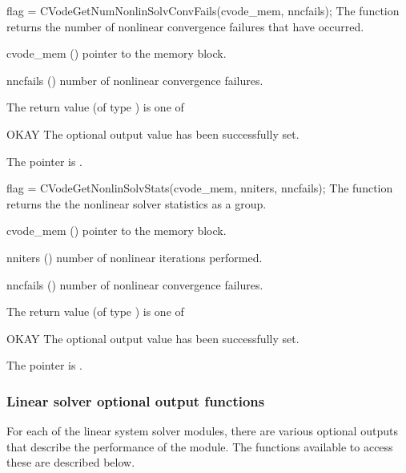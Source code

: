 {}
{
  flag = CVodeGetNumNonlinSolvConvFails(cvode\_mem, nncfails);
}
{
  The function  returns the
  number of nonlinear convergence failures that have occurred.
}
{
  \begin{args}
  \item[cvode\_mem] ()
    pointer to the {\cvode} memory block.
  \item[nncfails] ()
    number of nonlinear convergence failures.
  \end{args}
}
{
  The return value  (of type ) is one of
  \begin{args}
  \item[OKAY] 
    The optional output value has been successfully set.
  \item[\Id{CVG\_NO\_MEM}]
    The  pointer is .
  \end{args}
}
{}
{
  flag = CVodeGetNonlinSolvStats(cvode\_mem, nniters, nncfails);
}
{
  The function  returns the the
  {\cvode} nonlinear solver statistics as a group.
}
{
  \begin{args}
  \item[cvode\_mem] ()
    pointer to the {\cvode} memory block.
  \item[nniters] ()
    number of nonlinear iterations performed.
  \item[nncfails] ()
    number of nonlinear convergence failures.
  \end{args}
}
{
  The return value  (of type ) is one of
  \begin{args}
  \item[OKAY] 
    The optional output value has been successfully set.
  \item[\Id{CVG\_NO\_MEM}]
    The  pointer is .
  \end{args}
}
{}

\subsubsection{Linear solver optional output functions}

For each of the linear system solver modules, there are various optional 
outputs that describe the performance of the module. The functions available 
to access these are described below.

